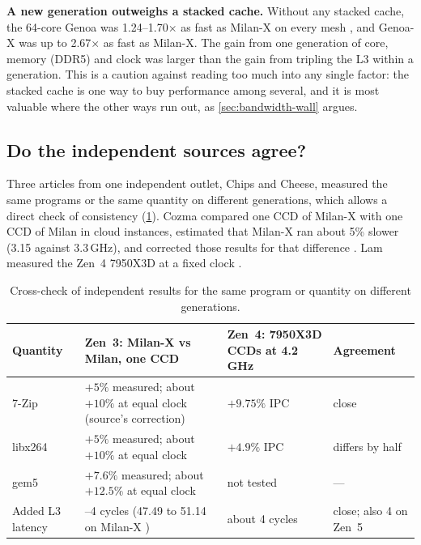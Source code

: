 \textbf{A new generation outweighs a stacked cache.} Without any stacked cache, the 64-core Genoa was 1.24--1.70$\times$ as fast as Milan-X on every mesh \cite{lawendaEvaluatingImpactL32025}, and Genoa-X was up to 2.67$\times$ as fast as Milan-X. The gain from one generation of core, memory (DDR5) and clock was larger than the gain from tripling the L3 within a generation. This is a caution against reading too much into any single factor: the stacked cache is one way to buy performance among several, and it is most valuable where the other ways run out, as \cref{sec:bandwidth-wall} argues.

\subsection{Do the independent sources agree?}
\label{sec:cross-check}
Three articles from one independent outlet, Chips and Cheese, measured the same programs or the same quantity on different generations, which allows a direct check of consistency (\cref{tab:cross-check}). Cozma compared one CCD of Milan-X with one CCD of Milan in cloud instances, estimated that Milan-X ran about 5\% slower (3.15 against 3.3\,GHz), and corrected those results for that difference \cite{cozmaDeepDivingZen2022}. Lam measured the Zen~4 7950X3D at a fixed clock \cite{lamAMDs7950X3DZen2023}.

\begin{table}[htbp]
  \centering
  \caption[Cross-check of independent results across generations]{Cross-check of independent results for the same program or quantity on different generations.}
  \label{tab:cross-check}
  \small
  \begin{tabularx}{\textwidth}{@{}l>{\raggedright\arraybackslash}X>{\raggedright\arraybackslash}X>{\raggedright\arraybackslash}p{2.3cm}@{}}
    \toprule
    \textbf{Quantity} & \textbf{Zen~3: Milan-X vs Milan, one CCD \cite{cozmaDeepDivingZen2022}} & \textbf{Zen~4: 7950X3D CCDs at 4.2\,GHz \cite{lamAMDs7950X3DZen2023}} & \textbf{Agreement} \\
    \midrule
    7-Zip & $+5\%$ measured; about $+10\%$ at equal clock (source's correction) & $+9.75\%$ IPC & close \\
    libx264 & $+5\%$ measured; about $+10\%$ at equal clock & $+4.9\%$ IPC & differs by half \\
    gem5 & $+7.6\%$ measured; about $+12.5\%$ at equal clock & not tested & --- \\
    Added L3 latency & 3--4 cycles (47.49 to 51.14 on Milan-X \cite{cozmaAMDsVCacheTested2022}) & about 4 cycles & close; also 4 on Zen~5 \cite{cozmaAMDs9800X3D2nd2024} \\
    \bottomrule
  \end{tabularx}
\end{table}

